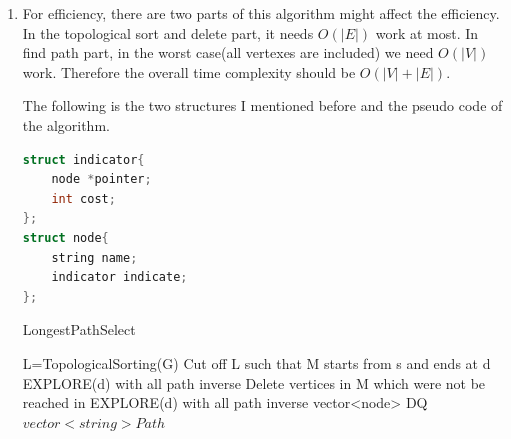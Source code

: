 \documentclass[12pt,a4paper]{article}
\makeatletter
\newtheorem*{solution}{Solution}
\theoremstyle{definition}
\renewenvironment{solution}[1][Solution] {\par\pushQED{\qed}\normalfont\topsep6\p@\@plus6\p@\relax\trivlist\item[\hskip\labelsep\bfseries#1\@addpunct{.}]\ignorespaces}{\popQED\endtrivlist\@endpefalse} \makeatother
\makeatother
\begin{document}
\begin{enumerate}
\begin{solution}
For efficiency, there are two parts of this algorithm might affect the efficiency. In the topological sort and delete part, it needs $O(|E|)$ work at most.
 In find path part, in the worst case(all vertexes are included) we need $O(|V|)$ work.
 Therefore the overall time complexity should be $O(|V|+|E|)$.
 
 The following is the two structures I mentioned before and the pseudo code of the algorithm.
 
\begin{lstlisting}[language=C++]
struct indicator{
	node *pointer;
	int cost;
};
struct node{
	string name;
	indicator indicate;
};
\end{lstlisting}
\begin{minipage}[t]{0.9\textwidth}
\begin{algorithm}[H]
	\BlankLine
	\caption{LongestPathSelect}\label{Alg_LongestPathSelect}
	\BlankLine
    L=TopologicalSorting(G)\;
    Cut off L such that M starts from s and ends at d\;
    EXPLORE(d) with all path inverse\;
    Delete vertices in M which were not be reached in EXPLORE(d) with all path inverse\;
    vector<node> DQ\;
    $vector<string> Path$\;
\end{algorithm}
\end{minipage}
\end{solution}


\end{enumerate}
\end{document}
